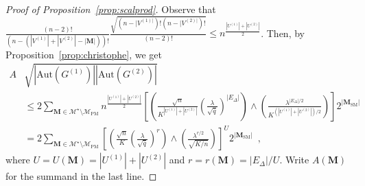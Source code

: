 \documentclass[final]{colt2026}
\newcommand{\1}{\mathbf{1}}
\begin{document}
\begin{proof}[Proof of Proposition~\ref{prop:scalprod}]
Observe that $\frac{(n-2)!}{\left(n-(|V^{(1)}|+ |V^{(2)}| - |\mathbf M|)\right)!} \frac{\sqrt{(n-|V^{(1)|})!(n-|V^{(2)|})!}}{(n-2)!}\leq n^{\frac{|U^{(1)}| + |U^{(2)}|}{2}}$. Then, by Proposition~\ref{prop:christophe}, we get 
    \begin{align*}
    A &\sqrt{\left|\mathrm{Aut}(G^{(1)})\right|\left|\mathrm{Aut}(G^{(2)})\right|}\\ 
    &\leq  2\sum_{\mathbf{M}\in\mathcal{M}^{\star}\setminus \mathcal{M}_{\mathrm{PM}}}n^{\frac{|U^{(1)}| + |U^{(2)}|}{2}}
    \left[\left(\frac{\sqrt{n}}{K^{|U^{(1)}|+ |U^{(2)}|}} \left(\frac{\lambda}{\sqrt{\bar q}}\right)^{|E_{\Delta}|}\right) \land \left(\frac{\lambda^{|E_{\Delta}|/2}}{K^{(|U^{(1)}|+ |U^{(2)}|)/2}} \right)\right]2^{|\mathbf M_{\mathrm{SM}}|}\nonumber\\
       & =  2%
        \sum_{\mathbf{M}\in\mathcal{M}^{\star}\setminus \mathcal{M}_{\mathrm{PM}}}\left[\left(\frac{\sqrt{n}}{K} \left(\frac{\lambda}{\sqrt{\bar q}}\right)^{r}\right) \land \left(\frac{\lambda^{r/2}}{\sqrt{K/n}} \right)\right]^U2^{|\mathbf M_{\mathrm{SM}}|}\enspace ,\nonumber
\end{align*}
where $U=U(\mathbf M) = |U^{(1)}|+ |U^{(2)}|$ and $r=r(\mathbf M) = |E_\Delta|/U$. Write $A(\mathbf M)$ for the summand in the last line.
    


\medskip 



\end{proof}
\end{document}
